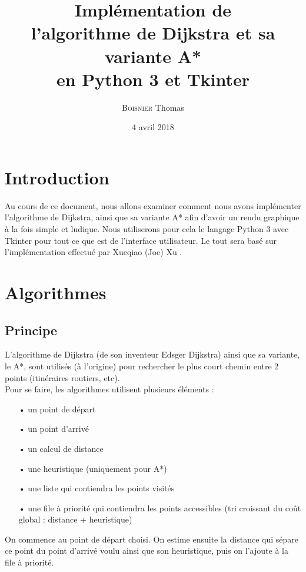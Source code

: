\documentclass{report}
\title{Implémentation de \\l'algorithme de Dijkstra et sa variante A* \\en Python 3 et Tkinter}
\author{\textsc{Boisnier} Thomas}
\date{4 avril 2018}
\begin{document}
\maketitle

\renewcommand{\contentsname}{Sommaire}
\tableofcontents



\chapter*{Introduction}
Au cours de ce document, nous allons examiner comment nous avons implémenter l'algorithme de Dijkstra, ainsi que sa variante A* \cite{Wiki} \cite{A*} afin d'avoir un rendu graphique à la fois simple et ludique.
Nous utiliserons pour cela le langage Python 3 \cite{Python} avec Tkinter \cite{Tkinter} pour tout ce que est de l'interface utilisateur.
Le tout sera basé sur l'implémentation effectué par Xueqiao (Joe) Xu \cite{PathFinding}.

\chapter{Algorithmes}
	\section{Principe}
	L'algorithme de Dijkstra (de son inventeur Edsger Dijkstra) ainsi que sa variante, le A*, sont utilisés (à l'origine) pour rechercher le plus court chemin entre 2 points (itinéraires routiers, etc).\\
	
	Pour se faire, les algorithmes utilisent plusieurs éléments :
	\begin{itemize}
		\item[•] un point de départ
		\item[•] un point d'arrivé
		\item[•] un calcul de distance
		\item[•] une heuristique (uniquement pour A*)
		\item[•] une liste qui contiendra les points visités
		\item[•] une file à priorité qui contiendra les points accessibles (tri croissant du coût global : distance + heuristique)
	\end{itemize}
	\vspace{4mm}
	On commence au point de départ choisi. 
	On estime ensuite la distance qui sépare ce point du point d'arrivé voulu ainsi que son heuristique, puis on l'ajoute à la file à priorité.
	
\end{document}
